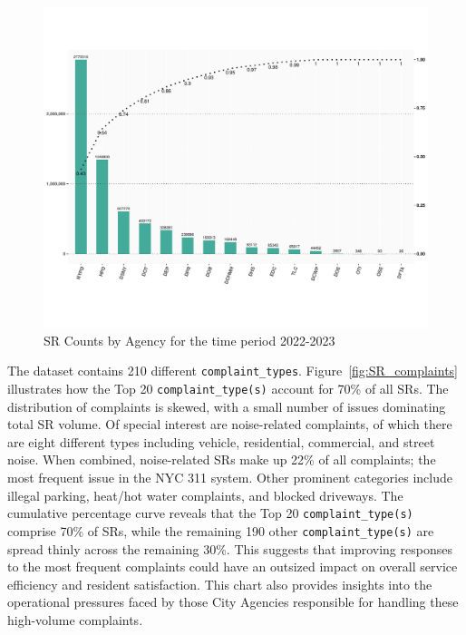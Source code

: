 \documentclass[linenumber]{jdsart}
\begin{document}
\begin{figure}[tbp]
	\centering
	\includegraphics[width = \textwidth]{SRs_by_Agency.pdf}
  	\caption{SR Counts by Agency for the time period 2022-2023}
	\label{fig:SRcountbyAgency}
\end{figure}

The dataset contains 210 different \texttt{complaint\_types}. 
Figure~\ref{fig:SR_complaints} illustrates how the Top 20 
\texttt{complaint\_type(s)} account for 70\% 
of all SRs. The distribution of complaints is skewed, 
with a small number of issues dominating total SR volume. 
Of special interest are noise-related complaints, of 
which there are eight different types including vehicle, 
residential, commercial, and street noise. When 
combined, noise-related SRs make up 22\% of all 
complaints; the most frequent issue in the NYC 311 system. 
Other prominent categories include illegal parking, heat/hot water 
complaints, and blocked driveways. The cumulative percentage curve 
reveals that the Top 20 \texttt{complaint\_type(s)} comprise 70\% of SRs,
while the remaining 190 other \texttt{complaint\_type(s)}  are spread thinly 
across the remaining 30\%. This suggests that improving 
responses to the most frequent complaints could have an 
outsized impact on overall service efficiency and resident 
satisfaction. This chart also provides insights into the 
operational pressures faced by those City Agencies 
responsible for handling these high-volume complaints.
\end{document}
